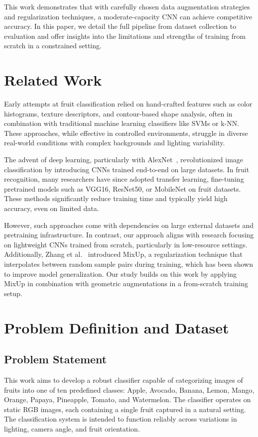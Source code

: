 \documentclass{article}
\begin{document}
This work demonstrates that with carefully chosen data augmentation strategies and regularization techniques, a moderate-capacity CNN can achieve competitive accuracy. In this paper, we detail the full pipeline from dataset collection to evaluation and offer insights into the limitations and strengths of training from scratch in a constrained setting.

\section{Related Work}
Early attempts at fruit classification relied on hand-crafted features such as color histograms, texture descriptors, and contour-based shape analysis, often in combination with traditional machine learning classifiers like SVMs or k-NN. These approaches, while effective in controlled environments, struggle in diverse real-world conditions with complex backgrounds and lighting variability.

The advent of deep learning, particularly with AlexNet~\cite{krizhevsky2012imagenet}, revolutionized image classification by introducing CNNs trained end-to-end on large datasets. In fruit recognition, many researchers have since adopted transfer learning, fine-tuning pretrained models such as VGG16, ResNet50, or MobileNet on fruit datasets. These methods significantly reduce training time and typically yield high accuracy, even on limited data.

However, such approaches come with dependencies on large external datasets and pretraining infrastructure. In contrast, our approach aligns with research focusing on lightweight CNNs trained from scratch, particularly in low-resource settings. Additionally, Zhang et al.~\cite{zhang2017mixup} introduced MixUp, a regularization technique that interpolates between random sample pairs during training, which has been shown to improve model generalization. Our study builds on this work by applying MixUp in combination with geometric augmentations in a from-scratch training setup.

\section{Problem Definition and Dataset}
\subsection{Problem Statement}
This work aims to develop a robust classifier capable of categorizing images of fruits into one of ten predefined classes: Apple, Avocado, Banana, Lemon, Mango, Orange, Papaya, Pineapple, Tomato, and Watermelon. The classifier operates on static RGB images, each containing a single fruit captured in a natural setting. The classification system is intended to function reliably across variations in lighting, camera angle, and fruit orientation.
\end{document}
